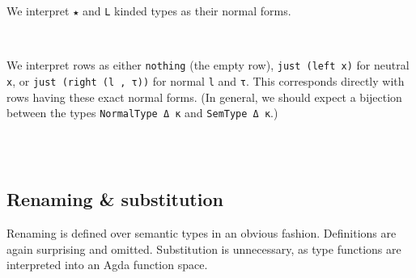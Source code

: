 \documentclass[authoryear, acmsmall, screen, review, nonacm]{acmart}
\begin{document}
\Ni We interpret \verb!★! and \verb!L! kinded types as their normal forms.

\begin{code}%
\>[0]\AgdaSpace{}%
\AgdaSpace{}%
\AgdaSpace{}%
\AgdaSymbol{=}\AgdaSpace{}%
\AgdaSpace{}%
\AgdaSpace{}%
\<%
\\
\>[0]\AgdaSpace{}%
\AgdaSpace{}%
\AgdaSpace{}%
\AgdaSymbol{=}\AgdaSpace{}%
\AgdaSpace{}%
\AgdaSpace{}%
\<%
\end{code}

\Ni We interpret rows as either \verb!nothing! (the empty row), \verb!just (left x)! for neutral \verb!x!, or \verb!just (right (l , τ))! for normal \verb!l! and \verb!τ!. This corresponds directly with rows having these exact normal forms. (In general, we should expect a bijection between the types \verb!NormalType Δ κ! and \verb!SemType Δ κ!.)

\begin{code}%
\>[0]\AgdaSpace{}%
\AgdaSpace{}%
\AgdaOperator{\AgdaInductiveConstructor{R[}}\AgdaSpace{}%
\AgdaSpace{}%
\AgdaOperator{\AgdaInductiveConstructor{]}}\AgdaSpace{}%
\AgdaSymbol{=}\AgdaSpace{}%
\<%
\\
\>[0][@{}l@{\AgdaIndent{0}}]%
\>[2]\AgdaSymbol{((}\AgdaSpace{}%
\AgdaSpace{}%
\AgdaOperator{\AgdaInductiveConstructor{R[}}\AgdaSpace{}%
\AgdaSpace{}%
\AgdaOperator{\AgdaInductiveConstructor{]}}\AgdaSymbol{)}\AgdaSpace{}%
\<%
\\
%
\>[2]\AgdaSymbol{(}\AgdaSpace{}%
\AgdaSpace{}%
\AgdaSpace{}%
\AgdaSpace{}%
\AgdaSpace{}%
\AgdaSpace{}%
\AgdaSymbol{))}\<%
\end{code}

\subsection{Renaming \& substitution}
Renaming is defined over semantic types in an obvious fashion. Definitions are again surprising and omitted. Substitution is unnecessary, as type functions are interpreted into an Agda function space.
\end{document}
